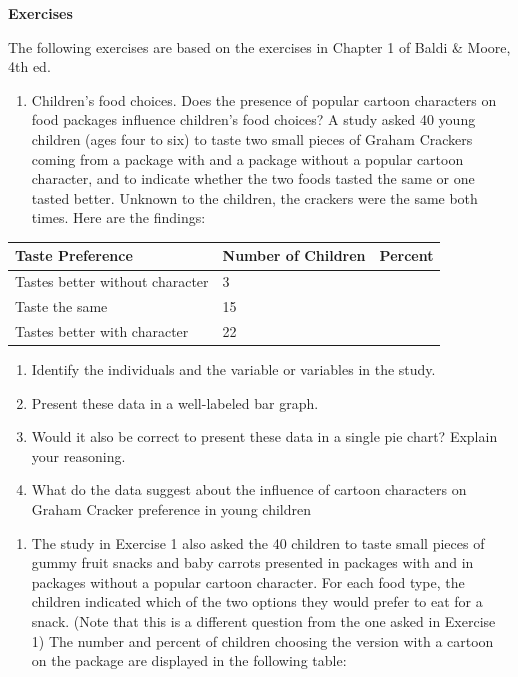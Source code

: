 \documentclass[
  letterpaper,
  DIV=11,
  numbers=noendperiod]{scrreprt}
\providecommand{\tightlist}{%
  \setlength{\itemsep}{0pt}\setlength{\parskip}{0pt}}\usepackage{longtable,booktabs,array}
\begin{document}
\textbf{Exercises}

The following exercises are based on the exercises in Chapter 1 of Baldi
\& Moore, 4th ed.

\begin{enumerate}
\def\labelenumi{\arabic{enumi}.}
\tightlist
\item
  Children's food choices. Does the presence of popular cartoon
  characters on food packages influence children's food choices? A study
  asked 40 young children (ages four to six) to taste two small pieces
  of Graham Crackers coming from a package with and a package without a
  popular cartoon character, and to indicate whether the two foods
  tasted the same or one tasted better. Unknown to the children, the
  crackers were the same both times. Here are the findings:
\end{enumerate}

\begin{longtable}[]{@{}lll@{}}
\toprule\noalign{}
Taste Preference & Number of Children & Percent \\
\midrule\noalign{}
\endhead
\bottomrule\noalign{}
\endlastfoot
Tastes better without character & 3 & \\
Taste the same & 15 & \\
Tastes better with character & 22 & \\
\end{longtable}

\begin{enumerate}
\def\labelenumi{\alph{enumi}.}
\tightlist
\item
  Identify the individuals and the variable or variables in the study.
\item
  Present these data in a well-labeled bar graph.
\item
  Would it also be correct to present these data in a single pie chart?
  Explain your reasoning.
\item
  What do the data suggest about the influence of cartoon characters on
  Graham Cracker preference in young children
\end{enumerate}

\begin{enumerate}
\def\labelenumi{\arabic{enumi}.}
\setcounter{enumi}{1}
\tightlist
\item
  The study in Exercise 1 also asked the 40 children to taste small
  pieces of gummy fruit snacks and baby carrots presented in packages
  with and in packages without a popular cartoon character. For each
  food type, the children indicated which of the two options they would
  prefer to eat for a snack. (Note that this is a different question
  from the one asked in Exercise 1) The number and percent of children
  choosing the version with a cartoon on the package are displayed in
  the following table:
\end{enumerate}
\end{document}
